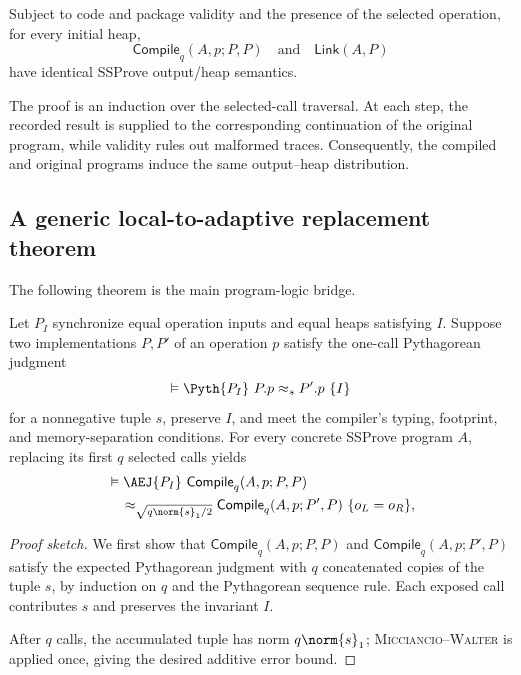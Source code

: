 \begin{theorem}
\label{thm:compile-same}
Subject to code and package validity and the presence of the selected
operation, for every initial heap,
\[
 \mathsf{Compile}_q(A,p;P,P)
 \quad\text{and}\quad
 \mathsf{Link}(A,P)
\]
have identical SSProve output/heap semantics.
\end{theorem}

The proof is an induction over the selected-call traversal.  At each step, the
recorded result is supplied to the corresponding continuation of the original
program, while validity rules out malformed traces.  Consequently, the
compiled and original programs induce the same output--heap distribution.

\subsection{A generic local-to-adaptive replacement theorem}

The following theorem is the main program-logic bridge.

\begin{theorem}
\label{thm:compile-replace}
Let \(P_I\) synchronize equal operation inputs and equal heaps satisfying
\(I\).  Suppose two implementations \(P,P'\) of an operation \(p\) satisfy
the one-call Pythagorean judgment
\[
 \vDash\Pyth\{P_I\}\ P.p\approx_s P'.p\ \{I\}
\]
for a nonnegative tuple \(s\), preserve \(I\), and meet the compiler's typing,
footprint, and memory-separation conditions.
For every concrete SSProve program \(A\), replacing its first
\(q\) selected calls yields
\[
\begin{aligned}
 &\vDash\AEJ\{P_I\}\ \mathsf{Compile}_q(A,p;P,P)\\
 &\quad\approx_{\sqrt{q\norm{s}_1/2}}
   \mathsf{Compile}_q(A,p;P',P)\ \{o_L=o_R\},
\end{aligned}
\]
\end{theorem}
\begin{proof}[Proof sketch]
We first show that \(\mathsf{Compile}_q(A,p;P,P)\) and
\(\mathsf{Compile}_q(A,p;P',P)\) satisfy the expected Pythagorean judgment with
\(q\) concatenated copies of the tuple \(s\), by induction on \(q\) and the
Pythagorean sequence rule.
Each exposed call contributes \(s\) and preserves the invariant \(I\).

After \(q\) calls, the accumulated tuple has norm
\(q\norm{s}_1\); \textsc{Micciancio--Walter} is applied once, giving the
desired additive error bound.
\end{proof}

